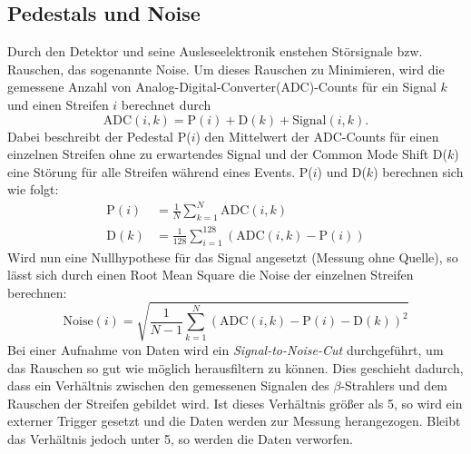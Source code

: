 \FloatBarrier
\subsection{Pedestals und Noise}
\label{sec:Theorie_Noise}
Durch den Detektor und seine Ausleseelektronik enstehen Störsignale bzw. Rauschen, das sogenannte Noise. Um dieses Rauschen zu Minimieren, wird die gemessene Anzahl von Analog-Digital-Converter(ADC)-Counts für ein Signal $k$ und einen Streifen $i$ berechnet durch
\begin{equation*}
  \text{ADC}(i, k) = \text{P}(i) + \text{D}(k) + \text{Signal}(i, k).
\end{equation*}
Dabei beschreibt der Pedestal P($i$) den Mittelwert der ADC-Counts für einen einzelnen Streifen ohne zu erwartendes Signal und der Common Mode Shift D($k$) eine Störung für alle Streifen während eines Events. P($i$) und D($k$) berechnen sich wie folgt:
\begin{align}
  \text{P}(i) &= \frac{1}{N} \sum_{k=1}^N \text{ADC}(i, k)
  \label{eqn:15} \\
  \text{D}(k) &= \frac{1}{128} \sum_{i=1}^{128} \left(\text{ADC}(i, k) - \text{P}(i) \right)
  \label{eqn:18}
\end{align}
Wird nun eine Nullhypothese für das Signal angesetzt (Messung ohne Quelle), so lässt sich durch einen Root Mean Square die Noise der einzelnen Streifen berechnen:
\begin{equation}
  \text{Noise}(i) = \sqrt{ \frac{1}{N-1} \sum_{k=1}^N \left(\text{ADC}(i,k) - \text{P} (i) - \text{D}(k)\right)^2 }
  \label{eqn:16}
\end{equation}
Bei einer Aufnahme von Daten wird ein \textit{Signal-to-Noise-Cut} durchgeführt, um das Rauschen so gut wie möglich herausfiltern zu können. Dies geschieht dadurch, dass ein Verhältnis zwischen den gemessenen Signalen des $\beta$-Strahlers und dem Rauschen der Streifen gebildet wird. Ist dieses Verhältnis größer als 5, so wird ein externer Trigger gesetzt und die Daten werden zur Messung herangezogen. Bleibt das Verhältnis jedoch unter 5, so werden die Daten verworfen.


